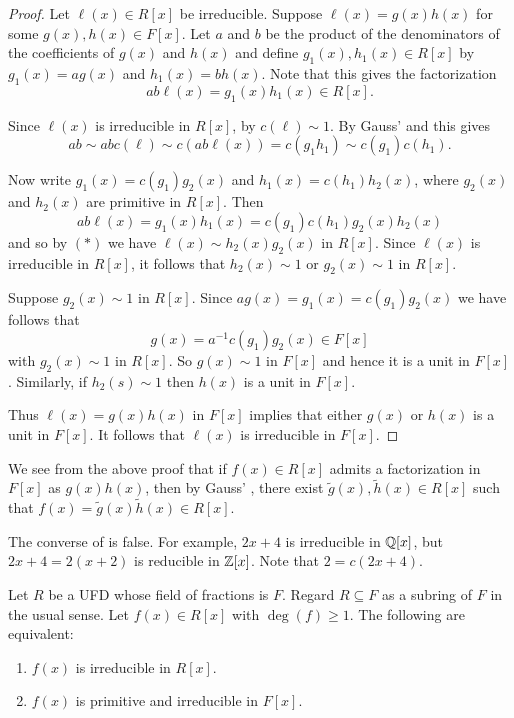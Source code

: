 \documentclass[11pt]{article}
\begin{document}
\begin{proof}
    Let $\ell(x)\in R[x]$ be irreducible. Suppose $\ell(x)=g(x)h(x)$ for some $g(x),h(x)\in F[x]$. Let $a$ and $b$ be the product of the denominators of the coefficients of $g(x)$ and $h(x)$ and define $g_1(x),h_1(x)\in R[x]$ by $g_1(x)=ag(x)$ and $h_1(x)=bh(x)$. Note that this gives the factorization
    \[ab\ell(x)=g_1(x)h_1(x)\in R[x].\]
    
    Since $\ell(x)$ is irreducible in $R[x]$, by  $c(\ell)\sim1$. By Gauss'  and  this gives
    \[ab\sim abc(\ell)\sim c(ab\ell(x))=c(g_1h_1)\sim c(g_1)c(h_1).\tag{$*$}\]
    
    Now write $g_1(x)=c(g_1)g_2(x)$ and $h_1(x)=c(h_1)h_2(x)$, where $g_2(x)$ and $h_2(x)$ are primitive in $R[x]$. Then
    \[ab\ell(x)=g_1(x)h_1(x)=c(g_1)c(h_1)g_2(x)h_2(x)\]
    and so by $(*)$ we have $\ell(x)\sim h_2(x)g_2(x)$ in $R[x]$. Since $\ell(x)$ is irreducible in $R[x]$, it follows that $h_2(x)\sim 1$ or $g_2(x)\sim 1$ in $R[x]$.

    Suppose $g_2(x)\sim 1$ in $R[x]$. Since $ag(x)=g_1(x)=c(g_1)g_2(x)$ we have follows that
    \[g(x)=a^{-1}c(g_1)g_2(x)\in F[x]\]
    with $g_2(x)\sim 1$ in $R[x]$. So $g(x)\sim 1$ in $F[x]$ and hence it is a unit in $F[x]$. Similarly, if $h_2(s)\sim 1$ then $h(x)$ is a unit in $F[x]$.
    
    Thus $\ell(x)=g(x)h(x)$ in $F[x]$ implies that either $g(x)$ or $h(x)$ is a unit in $F[x]$. It follows that $\ell(x)$ is irreducible in $F[x]$.
    
\end{proof}

\begin{remark}
    We see from the above proof that if $f(x)\in R[x]$ admits a factorization in $F[x]$ as $g(x)h(x)$, then by Gauss' , there exist $\tilde{g}(x),\tilde{h}(x)\in R[x]$ such that $f(x)=\tilde{g}(x)\tilde{h}(x)\in R[x]$.
\end{remark}

\begin{note}
    The converse of  is false. For example, $2x+4$ is irreducible in $\mathbb{Q}[x]$, but $2x+4=2(x+2)$ is reducible in $\mathbb{Z}[x]$. Note that $2=c(2x+4)$.
\end{note}

\begin{proposition}
    Let $R$ be a UFD whose field of fractions is $F$. Regard $R\subseteq F$ as a subring of $F$ in the usual sense. Let $f(x)\in R[x]$ with $\deg(f)\geq 1$. The following are equivalent:
    \begin{enumerate}
        \item $f(x)$ is irreducible in $R[x]$.
        \item $f(x)$ is primitive and irreducible in $F[x]$.
    \end{enumerate}
\end{proposition}
\end{document}
